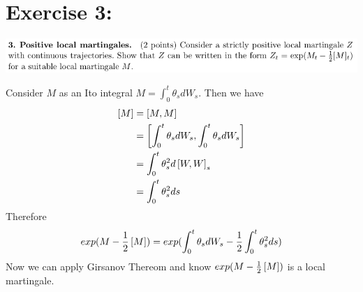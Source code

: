 \documentclass[document.tex]{subfiles}
\begin{document}
\section*{Exercise 3:}

\includegraphics[width=\textwidth]{ex3.png}

Consider $M$ as an Ito integral $M=\int_0^t \theta_s dW_s$.
Then we have
\begin{align*}
	\left[ M \right] &= \left[M , M \right] \\
	&=  \left[\int_0^t \theta_s dW_s , \int_0^t \theta_s dW_s \right] \\
	&= \int_0^t \theta_s^2 d \left[W , W \right]_s \\
	&= \int_0^t \theta_s^2 ds
\end{align*}
Therefore
\begin{align*}
	exp(M-\frac{1}{2}\left[ M \right]) = exp(\int_0^t \theta_s dW_s-\frac{1}{2}\int_0^t \theta_s^2 ds
) 
\end{align*}
Now we can apply Girsanov Thereom and know $exp(M-\frac{1}{2}\left[ M \right])$ is a local martingale.   
\end{document}
